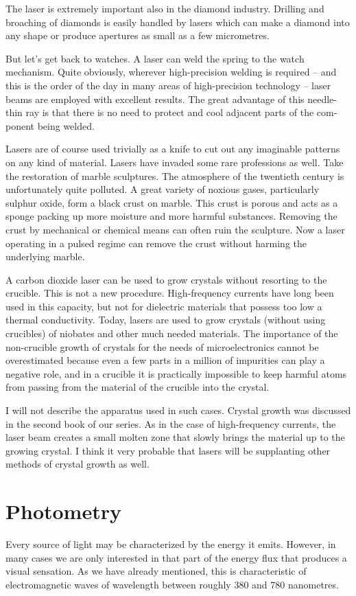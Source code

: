 The laser is extremely important also in the diamond industry. Drilling and broaching of diamonds is easily handled by lasers which can make a diamond into any shape or produce apertures as small as a few micrometres.

But let’s get back to watches. A laser can weld the spring to the watch mechanism. Quite obviously, wher­ever high-precision welding is required -- and this is the order of the day in many areas of high-precision technol­ogy -- laser beams are employed with excellent results. The great advantage of this needle-thin ray is that there is no need to protect and cool adjacent parts of the com­ponent being welded.

Lasers are of course used trivially as a knife to cut out any imaginable patterns on any kind of material. Lasers have invaded some rare professions as well. Take the restoration of marble sculptures. The atmosphere of the twentieth century is unfortunately quite pollut­ed. A great variety of noxious gases, particularly sulphur oxide, form a black crust on marble. This crust is porous and acts as a sponge packing up more moisture and more harmful substances. Removing the crust by mechanical or chemical means can often ruin the sculpture. Now a laser operating in a pulsed regime can remove the crust without harming the underlying marble.

A carbon dioxide laser can be used to grow crystals without resorting to the crucible. This is not a new pro­cedure. High-frequency currents have long been used in this capacity, but not for dielectric materials that possess too low a thermal conductivity. Today, lasers are used to grow crystals (without using crucibles) of niobates and other much needed materials. The importance of the non-crucible growth of crystals for the needs of microelec­tronics cannot be overestimated because even a few parts in a million of impurities can play a negative role, and in a crucible it is practically impossible to keep harmful atoms from passing from the material of the crucible into the crystal.

I will not describe the apparatus used in such cases. Crystal growth was discussed in the second book of our series. As in the case of high-frequency currents, the laser beam creates a small molten zone that slowly brings the material up to the growing crystal. I think it very prob­able that lasers will be supplanting other methods of crystal growth as well.

\section{Photometry}
Every source of light may be characterized by the energy it emits. However, in many cases we are only interested in that part of the energy flux that produces a visual sensation. As we have already mentioned, this is characteristic of electromagnetic waves of wavelength between roughly 380 and 780 nanometres.

